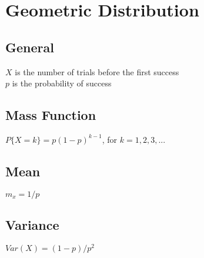 \section*{Geometric Distribution}

\subsection*{General}
$X$ is the number of trials before the first success \\
$p$ is the probability of success

\subsection*{Mass Function}
$P\{X=k\} = p(1-p)^{k-1}$, for $k=1,2,3,...$

\subsection*{Mean}
$m_x=1/p$

\subsection*{Variance}
$Var(X)=(1-p)/p^2$

    

